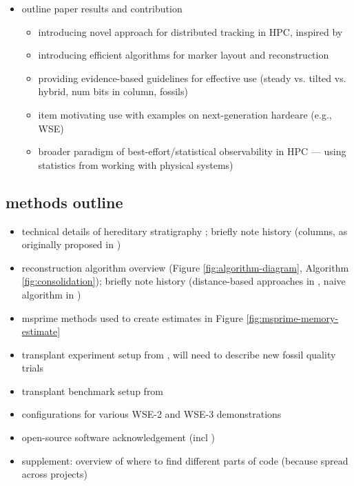 \begin{itemize}
\item outline paper results and contribution
   \begin{itemize}
   \item introducing novel approach for distributed tracking in HPC, inspired by
   \item introducing efficient algorithms for marker layout and reconstruction
   \item providing evidence-based guidelines for effective use (steady vs. tilted vs. hybrid, num bits in column, fossils)
   \item item motivating use with examples on next-generation hardeare (e.g., WSE)
   \item broader paradigm of best-effort/statistical observability in HPC --- using statistics from working with physical systems)
   \end{itemize}
\end{itemize}

\subsection{methods outline}

\begin{itemize}
\item technical details of hereditary stratigraphy \citep{moreno2024algorithms}; briefly note history (columns, as originally proposed in \citep{moreno2022hereditary})
\item reconstruction algorithm overview (Figure \ref{fig:algorithm-diagram}, Algorithm \ref{fig:consolidation}); briefly note history (distance-based approaches in \citep{moreno2022hereditary}, naive algorithm in \citep{moreno2023toward})
\item msprime methods used to create estimates in Figure \ref{fig:msprime-memory-estimate}
\item transplant experiment setup from \citep{moreno2025testing}, will need to describe new fossil quality trials
\item transplant benchmark setup from \citep{singhvi2025scalable}
\item configurations for various WSE-2 and WSE-3 demonstrations
\item open-source software acknowledgement (incl \citep{zanini2025unified})
\item supplement: overview of where to find different parts of code (because spread across projects)
\end{itemize}

